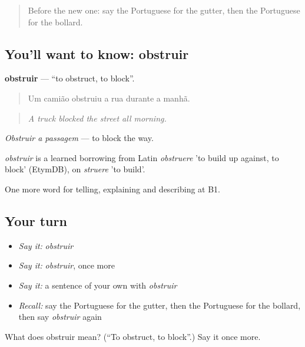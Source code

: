 \label{lesson:PT-C444-obstruir}



\begin{quote}
Before the new one: say the Portuguese for the gutter, then the Portuguese for the bollard.
\end{quote}

\subsection*{You'll want to know: obstruir}
\textbf{obstruir} — \textquotedblleft{}to obstruct, to block\textquotedblright{}.

\begin{quote}
Um camião obstruiu a rua durante a manhã.
\end{quote}

\begin{quote}
\emph{A truck blocked the street all morning.}
\end{quote}

\emph{Obstruir a passagem} — to block the way.

\begin{cousinweb}
\emph{obstruir} is a learned borrowing from Latin \emph{obstruere} 'to build up against, to block' (EtymDB), on \emph{struere} 'to build'.
\end{cousinweb}

\begin{grammarlens}[title={What you've built}]
One more word for telling, explaining and describing at B1.
\end{grammarlens}

\subsection*{Your turn}
\begin{itemize}
\raggedright
  \item \emph{Say it:} \emph{obstruir}
  \item \emph{Say it:} \emph{obstruir}, once more
  \item \emph{Say it:} a sentence of your own with \emph{obstruir}
  \item \emph{Recall:} say the Portuguese for the gutter, then the Portuguese for the bollard, then say \emph{obstruir} again
\end{itemize}

\begin{tcolorbox}[breakable,colback=teal!4,colframe=teal!35!black,title={Before you move on}]
What does obstruir mean? (\textquotedblleft{}To obstruct, to block\textquotedblright{}.) Say it once more.
\end{tcolorbox}

